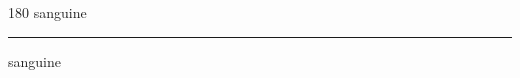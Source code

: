 
\begin{frame}
\begin{center}
\begin{turn}{180}
{\fontsize{2.5cm}{1em}\selectfont sanguine}
\end{turn}
\vspace{1em}\par  
\hrule
\vspace{1em}\par  
{\fontsize{2.5cm}{1em}\selectfont sanguine}
\end{center}
\end{frame}
